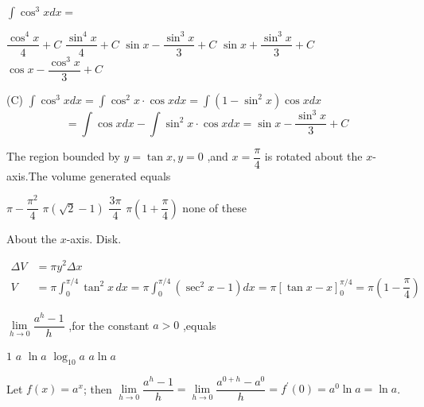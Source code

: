 \question
$\int \cos ^{3} x d x=$
\begin{choices}
  \choice $\dfrac{\cos ^{4} x}{4}+C$
  \choice $\dfrac{\sin ^{4} x}{4}+C$
  \CorrectChoice $\sin x-\dfrac{\sin ^{3} x}{3}+C$
  \choice $\sin x+\dfrac{\sin ^{3} x}{3}+C$
  \choice $\cos x-\dfrac{\cos ^{3} x}{3}+C$
\end{choices}
\begin{solution}
(C) $\int \cos ^{3} x d x=\int \cos ^{2} x \cdot \cos x d x=\int\left(1-\sin ^{2} x\right) \cos x d x$
\[
=\int \cos x d x-\int \sin ^{2} x \cdot \cos x d x=\sin x-\dfrac{\sin ^{3} x}{3}+C
\]
\end{solution}


\newpage





\question
The region bounded by $y=\tan x, y=0$ ,and $x=\dfrac{\pi}{4}$ is rotated about the $x$-axis.The volume generated equals
\begin{choices}
  \CorrectChoice $\pi-\dfrac{\pi^{2}}{4}$
  \choice $\pi(\sqrt{2}-1)$
  \choice $\dfrac{3 \pi}{4}$
  \choice $\pi\left(1+\dfrac{\pi}{4}\right)$
  \choice none of these
\end{choices}
\begin{solution}
About the $x$-axis. Disk.


\[
\begin{aligned}
\Delta V &= \pi y^{2} \Delta x \\
V &= \pi \displaystyle\int_{0}^{\pi / 4} \tan ^{2} x\, d x
   = \pi \displaystyle\int_{0}^{\pi / 4}\left(\sec ^{2} x-1\right) d x
   = \pi[\tan x-x]_{0}^{\pi / 4}
   = \pi\left(1-\dfrac{\pi}{4}\right)
\end{aligned}
\]


\end{solution}

\question
$\lim\limits_{h \to 0} \dfrac{a^{h}-1}{h}$ ,for the constant $a>0$ ,equals
\begin{choices}
  \choice $1$
  \choice $a$
  \CorrectChoice $\ln a$
  \choice $\log_{10} a$
  \choice $a \ln a$
\end{choices}
\begin{solution}
Let $f(x)=a^{x}$; then $\lim\limits_{h \to 0} \dfrac{a^{h}-1}{h}=\lim\limits_{h \to 0} \dfrac{a^{0+h}-a^{0}}{h}=f^{\prime}(0)=a^{0} \ln a=\ln a$.
\end{solution}


\newpage





